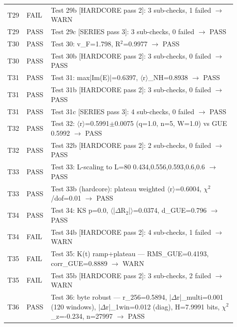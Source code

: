 \documentclass[10pt]{article}
\begin{document}
\begin{longtable}{p{0.06\linewidth} p{0.09\linewidth} p{0.78\linewidth}}
T29 & FAIL & Test 29b [HARDCORE pass 2]: 3 sub-checks, 1 failed $\rightarrow$ WARN \\

T29 & PASS & Test 29c [SERIES pass 3]: 3 sub-checks, 0 failed $\rightarrow$ PASS \\

T30 & PASS & Test 30: v\_F=1.798, R$^2$=0.9977 $\rightarrow$ PASS \\

T30 & PASS & Test 30b [HARDCORE pass 2]: 3 sub-checks, 0 failed $\rightarrow$ PASS \\

T31 & PASS & Test 31: max|Im(E)|=0.6397, $\langle$r$\rangle$\_NH=0.8938 $\rightarrow$ PASS \\

T31 & PASS & Test 31b [HARDCORE pass 2]: 3 sub-checks, 0 failed $\rightarrow$ PASS \\

T31 & PASS & Test 31c [SERIES pass 3]: 4 sub-checks, 0 failed $\rightarrow$ PASS \\

T32 & PASS & Test 32: $\langle$r$\rangle$=0.5991$\pm$0.0075 (q=1.0, n=5, W=1.0) vs GUE 0.5992 $\rightarrow$ PASS \\

T32 & PASS & Test 32b [HARDCORE pass 2]: 2 sub-checks, 0 failed $\rightarrow$ PASS \\

T33 & PASS & Test 33: L-scaling to L=80 0.434,0.556,0.593,0.6,0.6 $\rightarrow$ PASS \\

T33 & PASS & Test 33b (hardcore): plateau weighted $\langle$r$\rangle$=0.6004, $\chi$$^2$/dof=0.01 $\rightarrow$ PASS \\

T34 & PASS & Test 34: KS p=0.0, $\langle$|$\Delta$R$_2$|$\rangle$=0.0374, d\_GUE=0.796 $\rightarrow$ PASS \\

T34 & FAIL & Test 34b [HARDCORE pass 2]: 4 sub-checks, 1 failed $\rightarrow$ WARN \\

T35 & FAIL & Test 35: K(t) ramp+plateau --- RMS\_GUE=0.4193, corr\_GUE=0.8889 $\rightarrow$ WARN \\

T35 & FAIL & Test 35b [HARDCORE pass 2]: 3 sub-checks, 2 failed $\rightarrow$ WARN \\

T36 & PASS & Test 36: byte robust --- r\_256=0.5894, |$\Delta$r|\_multi=0.001 (120 windows), |$\Delta$r|\_1win=0.012 (diag), H=7.9991 bits, $\chi$$^2$\_z=-0.234, n=27997 $\rightarrow$ PASS \\


\end{longtable}
\end{document}
